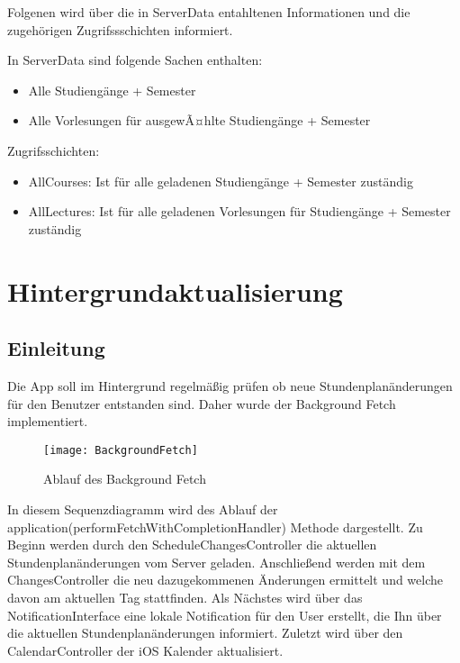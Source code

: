 Folgenen wird über die in ServerData entahltenen Informationen und die zugehörigen Zugrifssschichten informiert.

In ServerData sind folgende Sachen enthalten:
\begin{itemize}
     \item Alle Studiengänge + Semester
     \item Alle Vorlesungen für ausgewÃ¤hlte Studiengänge + Semester \\     
\end{itemize}

Zugrifsschichten: 
\begin{itemize}
     \item AllCourses: Ist für alle geladenen Studiengänge + Semester zuständig
     \item AllLectures: Ist für alle geladenen Vorlesungen für Studiengänge + Semester zuständig\\
\end{itemize}

\newpage
\chapter{Hintergrundaktualisierung}
\section{Einleitung}
Die App soll im Hintergrund regelmäßig prüfen ob neue Stundenplanänderungen für den Benutzer entstanden sind.
Daher wurde der Background Fetch implementiert.
\begin{figure}[htb]
    \centering
    \texttt{[image: BackgroundFetch]}
    \caption{Ablauf des Background Fetch}
\end{figure}

In diesem Sequenzdiagramm wird des Ablauf der application(performFetchWithCompletionHandler) Methode dargestellt. 
Zu Beginn werden durch den ScheduleChangesController die aktuellen Stundenplanänderungen vom Server geladen. 
Anschließend werden mit dem ChangesController die neu dazugekommenen Änderungen ermittelt und welche davon am aktuellen Tag stattfinden. Als Nächstes wird über das NotificationInterface eine lokale Notification für den User erstellt, die Ihn über die aktuellen Stundenplanänderungen informiert.
Zuletzt wird über den CalendarController der iOS Kalender aktualisiert.
